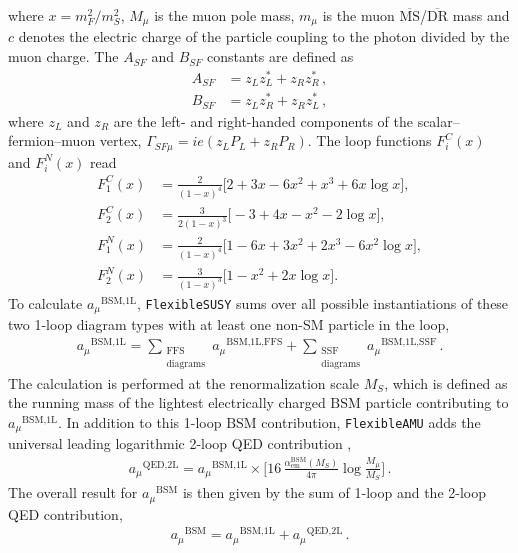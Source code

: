 \documentclass[final,3p,11pt,pdflatex]{elsarticle}
\makeatletter
\newcommand{\fs}{\texttt{FlexibleSUSY}\@\xspace}
\newcommand{\famu}{\texttt{FlexibleAMU}\@\xspace}
\newcommand{\ol}[1]{\overline{#1}}
\newcommand{\MSbar}{\ensuremath{\ol{\text{MS}}}\xspace}
\newcommand{\DRbar}{\ensuremath{\ol{\text{DR}}}\xspace}
\newcommand{\BSM}{\ensuremath{\text{BSM}}\xspace}
\newcommand{\MS}{\ensuremath{M_S}\xspace}
\newcommand{\QED}{\ensuremath{\text{QED}}}
\newcommand{\amu}{\ensuremath{a_\mu}\xspace}
\newcommand{\amuBSM}{\ensuremath{\amu^{\BSM}}\xspace}
\def\aem{\alpha_{\text{em}}}
\makeatother
\begin{document}
%
where $x=m_F^2/m_{S}^2$, $M_\mu$ is the muon pole mass,
$m_\mu$ is the muon \MSbar/\DRbar mass and $c$ denotes the electric charge of
the particle coupling to the photon divided by the muon charge.  The
$A_{SF}$ and $B_{SF}$ constants are defined as
%
\begin{align}
  \label{eq:ASF}
  A_{SF} &= z_L z_L^* + z_R z_R^* \,,\\
  \label{eq:BSF}
  B_{SF} &= z_L z_R^* + z_R z_L^* \,,
\end{align}
%
where $z_L$ and $z_R$ are the left- and right-handed components of the
scalar--fermion--muon vertex, $\Gamma_{SF\mu} =
ie(z_L P_L + z_R P_R)$.
%
The loop functions $F_i^C(x)$ and $F_i^N(x)$ read
%
\begin{align}
  F_1^C(x) &= \frac{2}{(1-x)^4} \Big[ 2 + 3x - 6x^2 + x^3 + 6x\log x \Big], \\
  F_2^C(x) &= \frac{3}{2(1-x)^3} \Big[ -3 + 4x - x^2 - 2\log x \Big], \\
  F_1^N(x) &= \frac{2}{(1-x)^4} \Big[ 1 - 6x + 3x^2 + 2x^3 - 6x^2\log x \Big], \\
  F_2^N(x) &= \frac{3}{(1-x)^3} \Big[ 1 - x^2 + 2x\log x \Big].
\end{align}
%
To calculate $\amu^{\BSM\text{,1L}}$, \fs sums over all possible
instantiations of these two 1-loop diagram types with at least one
non-SM particle in the loop,
%
\begin{align}
  \label{eq:amu BSM 1L}
  \amu^{\BSM\text{,1L}} =
  \sum_{\substack{\text{FFS}\\\text{diagrams}}} \amu^{\BSM\text{,1L,FFS}}
  + \sum_{\substack{\text{SSF}\\\text{diagrams}}} \amu^{\BSM\text{,1L,SSF}} \,.
\end{align}
%
The calculation is performed at the renormalization scale $\MS$, which
is defined as the running mass of the lightest electrically charged
\BSM particle contributing to $\amu^{\BSM\text{,1L}}$.  In addition to
this 1-loop \BSM contribution, \famu adds the universal leading
logarithmic 2-loop QED contribution \cite{Degrassi:1998es},
%
\begin{align}
  \amu^{\QED,\text{2L}} = \amu^{\BSM\text{,1L}} \times \Bigg[
    16 \, \frac{\aem^\BSM(\MS)}{4\pi}
    \log\frac{M_\mu}{\MS}
  \Bigg] \,.
\end{align}
%
The overall result for \amuBSM is then given by the sum of 1-loop and
the 2-loop QED contribution,
%
\begin{align}
  \amuBSM = \amu^{\BSM\text{,1L}} + \amu^{\QED,\text{2L}} \,.
\end{align}
\end{document}
